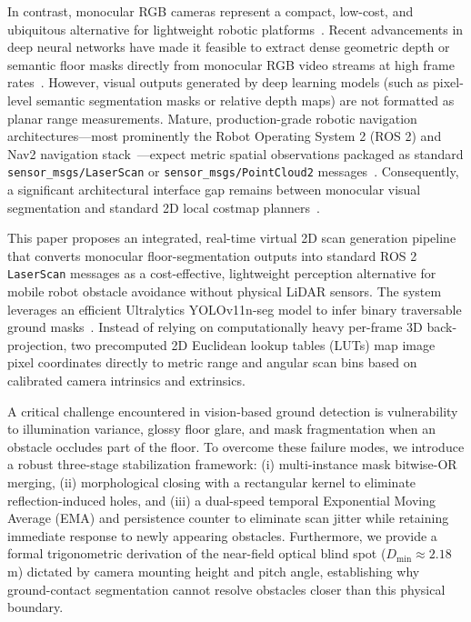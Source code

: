 \documentclass{ieeeaccess}
\begin{document}
In contrast, monocular RGB cameras represent a compact, low-cost, and ubiquitous alternative for lightweight robotic platforms~\cite{kim2022opensource}. Recent advancements in deep neural networks have made it feasible to extract dense geometric depth or semantic floor masks directly from monocular RGB video streams at high frame rates~\cite{shariqfarooqbhat_2021_adabins,ranftl_2021_vision,ultralytics_2024_ultralytics}. However, visual outputs generated by deep learning models (such as pixel-level semantic segmentation masks or relative depth maps) are not formatted as planar range measurements. Mature, production-grade robotic navigation architectures---most prominently the Robot Operating System 2 (ROS 2) and Nav2 navigation stack~\cite{macenski_2022_robot,macenski_2023_from}---expect metric spatial observations packaged as standard \texttt{sensor\_msgs/LaserScan} or \texttt{sensor\_msgs/PointCloud2} messages~\cite{openrobotics_sensor_msgslaserscan}. Consequently, a significant architectural interface gap remains between monocular visual segmentation and standard 2D local costmap planners~\cite{openrobotics_2020_depthimage_to_laserscan,opennavigationllc_2023_costmap}.

This paper proposes an integrated, real-time virtual 2D scan generation pipeline that converts monocular floor-segmentation outputs into standard ROS 2 \texttt{LaserScan} messages as a cost-effective, lightweight perception alternative for mobile robot obstacle avoidance without physical LiDAR sensors. The system leverages an efficient Ultralytics YOLOv11n-seg model to infer binary traversable ground masks~\cite{ultralytics_2024_ultralytics}. Instead of relying on computationally heavy per-frame 3D back-projection, two precomputed 2D Euclidean lookup tables (LUTs) map image pixel coordinates directly to metric range and angular scan bins based on calibrated camera intrinsics and extrinsics.

A critical challenge encountered in vision-based ground detection is vulnerability to illumination variance, glossy floor glare, and mask fragmentation when an obstacle occludes part of the floor. To overcome these failure modes, we introduce a robust three-stage stabilization framework: (i) multi-instance mask bitwise-OR merging, (ii) morphological closing with a rectangular kernel to eliminate reflection-induced holes, and (iii) a dual-speed temporal Exponential Moving Average (EMA) and persistence counter to eliminate scan jitter while retaining immediate response to newly appearing obstacles. Furthermore, we provide a formal trigonometric derivation of the near-field optical blind spot ($D_{\min} \approx 2.18$\,m) dictated by camera mounting height and pitch angle, establishing why ground-contact segmentation cannot resolve obstacles closer than this physical boundary.
\end{document}
